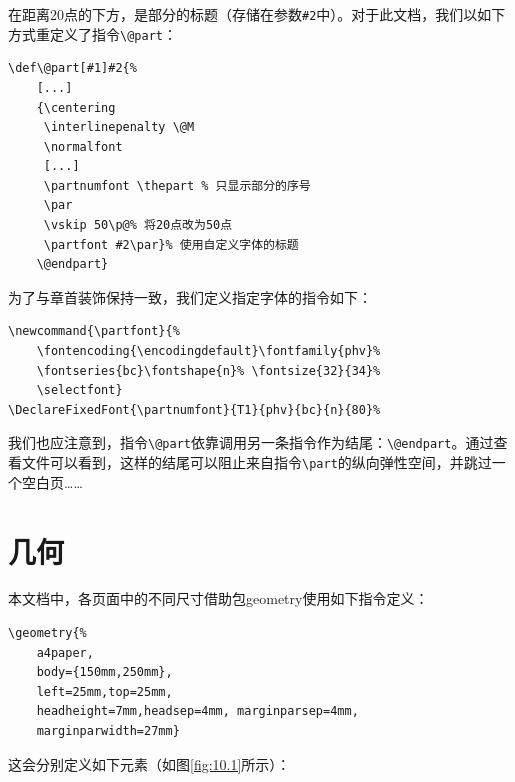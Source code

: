 在距离20点的下方，是部分的标题（存储在参数\verb|#2|中）。对于此文档，我们以如下方式重定义了指令\verb|\@part|：

\begin{dmd}
\begin{verbatim}
\def\@part[#1]#2{% 
    [...]
    {\centering
     \interlinepenalty \@M
     \normalfont
     [...]
     \partnumfont \thepart % 只显示部分的序号
     \par
     \vskip 50\p@% 将20点改为50点
     \partfont #2\par}% 使用自定义字体的标题
    \@endpart}
\end{verbatim}
\end{dmd}

为了与章首装饰保持一致，我们定义指定字体的指令如下：

\begin{dmd}
\begin{verbatim}
\newcommand{\partfont}{% 
    \fontencoding{\encodingdefault}\fontfamily{phv}% 
    \fontseries{bc}\fontshape{n}% \fontsize{32}{34}%
    \selectfont}
\DeclareFixedFont{\partnumfont}{T1}{phv}{bc}{n}{80}%
\end{verbatim}
\end{dmd}

\begin{exclamation}
我们也应注意到，指令\verb+\@part+依靠调用另一条指令作为结尾：\verb|\@endpart|。通过查看文件可以看到，这样的结尾可以阻止来自指令\verb|\part|的纵向弹性空间，并跳过一个空白页……
\end{exclamation}

\section{几何}

本文档中，各页面中的不同尺寸借助包\textsf{geometry}使用如下指令定义：

\begin{dmd}
\begin{verbatim}
\geometry{%
    a4paper, 
    body={150mm,250mm}, 
    left=25mm,top=25mm, 
    headheight=7mm,headsep=4mm, marginparsep=4mm, 
    marginparwidth=27mm}
\end{verbatim}
\end{dmd}

这会分别定义如下元素（如图\ref{fig:10.1}所示）：

